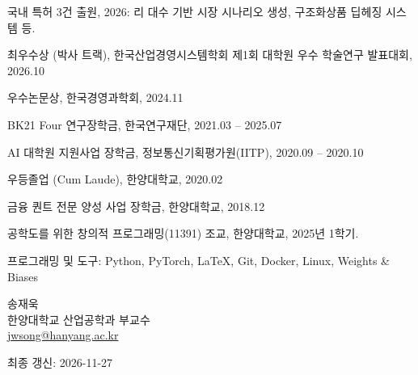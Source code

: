 \documentclass[11pt]{article}
\renewcommand{\lastupdate}{\par\vspace{18pt}\hfill{\small 최종 갱신: 2026-11-27}\par}
\begin{document}
\begin{blist}
\item 국내 특허 3건 출원, 2026: 리 대수 기반 시장 시나리오 생성, 구조화상품 딥헤징 시스템 등.
\end{blist}

\clearpage
{}
\begin{blist}[itemsep=3pt]
\item 최우수상 (박사 트랙), 한국산업경영시스템학회 제1회 대학원 우수 학술연구 발표대회, 2026.10
\item 우수논문상, 한국경영과학회, 2024.11
\item BK21 Four 연구장학금, 한국연구재단, 2021.03 – 2025.07
\item AI 대학원 지원사업 장학금, 정보통신기획평가원(IITP), 2020.09 – 2020.10
\item 우등졸업 (Cum Laude), 한양대학교, 2020.02
\item 금융 퀀트 전문 양성 사업 장학금, 한양대학교, 2018.12
\end{blist}

\begin{blist}
\item 공학도를 위한 창의적 프로그래밍(11391) 조교, 한양대학교, 2025년 1학기.
\end{blist}

\begin{blist}
\item {프로그래밍 및 도구}: Python, PyTorch, \LaTeX, Git, Docker, Linux, Weights \& Biases
\end{blist}

\begin{ind}
송재욱\\
한양대학교 산업공학과 부교수\\
\href{mailto:jwsong@hanyang.ac.kr}{jwsong@hanyang.ac.kr}
\end{ind}

\lastupdate
\end{document}
